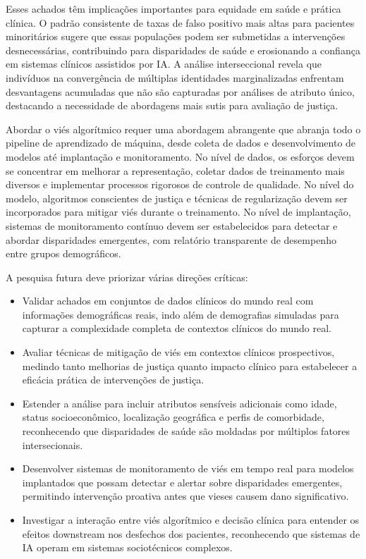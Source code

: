 Esses achados têm implicações importantes para equidade em saúde e 
prática clínica. O padrão consistente de taxas de falso positivo mais 
altas para pacientes minoritários sugere que essas populações podem ser 
submetidas a intervenções desnecessárias, contribuindo para disparidades 
de saúde e erosionando a confiança em sistemas clínicos assistidos por IA. 
A análise interseccional revela que indivíduos na convergência de múltiplas 
identidades marginalizadas enfrentam desvantagens acumuladas que não são 
capturadas por análises de atributo único, destacando a necessidade de 
abordagens mais sutis para avaliação de justiça.

Abordar o viés algorítmico requer uma abordagem abrangente que abranja 
todo o pipeline de aprendizado de máquina, desde coleta de dados e 
desenvolvimento de modelos até implantação e monitoramento. No nível de 
dados, os esforços devem se concentrar em melhorar a representação, 
coletar dados de treinamento mais diversos e implementar processos 
rigorosos de controle de qualidade. No nível do modelo, algoritmos 
conscientes de justiça e técnicas de regularização devem ser incorporados 
para mitigar viés durante o treinamento. No nível de implantação, sistemas 
de monitoramento contínuo devem ser estabelecidos para detectar e abordar 
disparidades emergentes, com relatório transparente de desempenho entre 
grupos demográficos.

A pesquisa futura deve priorizar várias direções críticas:

\begin{itemize}[leftmargin=*]
    \item Validar achados em conjuntos de dados clínicos do mundo real com 
          informações demográficas reais, indo além de demografias simuladas 
          para capturar a complexidade completa de contextos clínicos do 
          mundo real.
    \item Avaliar técnicas de mitigação de viés em contextos clínicos 
          prospectivos, medindo tanto melhorias de justiça quanto impacto 
          clínico para estabelecer a eficácia prática de intervenções 
          de justiça.
    \item Estender a análise para incluir atributos sensíveis adicionais 
          como idade, status socioeconômico, localização geográfica e 
          perfis de comorbidade, reconhecendo que disparidades de saúde 
          são moldadas por múltiplos fatores intersecionais.
    \item Desenvolver sistemas de monitoramento de viés em tempo real para 
          modelos implantados que possam detectar e alertar sobre disparidades 
          emergentes, permitindo intervenção proativa antes que vieses 
          causem dano significativo.
    \item Investigar a interação entre viés algorítmico e decisão clínica 
          para entender os efeitos downstream nos desfechos dos pacientes, 
          reconhecendo que sistemas de IA operam em sistemas sociotécnicos 
          complexos.
\end{itemize}

